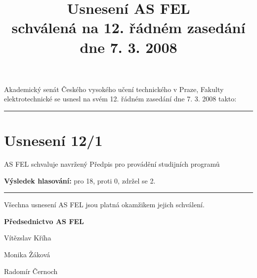 \documentclass[a4paper,12pt,notitlepage]{article}
\title{Usnesení AS FEL\\schválená na 12. řádném zasedání dne 7. 3. 2008}
\author{}\date{}
\newcommand{\hr}{\bigskip\hrule\bigskip}
\newcommand{\usneseni}[5]{
\section*{#1}

#2

\textbf{Výsledek hlasování:} pro #3, proti #4, zdržel se #5.}
\begin{document}
\maketitle
\thispagestyle{empty}


Akademický senát Českého vysokého učení technického v Praze, Fakulty
elektrotechnické se usnesl na svém 12. řádném zasedání dne 7. 3. 2008 takto:\hr


\usneseni{Usnesení 12/1}{AS FEL schvaluje navržený Předpis pro provádění studijních programů}{18}{0}{2}

\bigskip\bigskip\bigskip\bigskip\bigskip\bigskip\hr
Všechna usnesení AS FEL jsou platná okamžikem jejich schválení.

\begin{center}
\textbf{Předsednictvo AS FEL}

Vítězslav Kříha

Monika Žáková

Radomír Černoch
\end{center}
\end{document}
